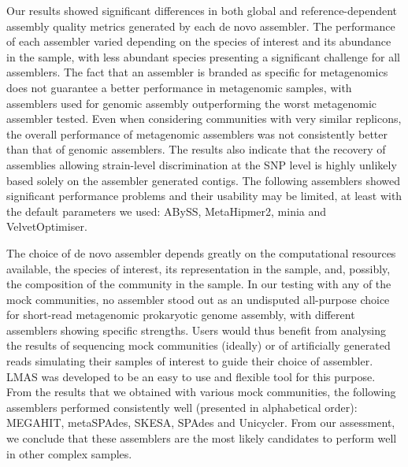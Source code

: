 Our results showed significant differences in both global and reference-dependent assembly quality metrics generated by each de novo assembler. The performance of each assembler varied depending on the species of interest and its abundance in the sample, with less abundant species presenting a significant challenge for all assemblers. The fact that an assembler is branded as specific for metagenomics does not guarantee a better performance in metagenomic samples, with assemblers used for genomic assembly outperforming the worst metagenomic assembler tested. Even when considering communities with very similar replicons, the overall performance of metagenomic assemblers was not consistently better than that of genomic assemblers. The results also indicate that the recovery of assemblies allowing strain-level discrimination at the SNP level is highly unlikely based solely on the assembler generated contigs. The following assemblers showed significant performance problems and their usability may be limited, at least with the default parameters we used: ABySS, MetaHipmer2, minia and VelvetOptimiser.

The choice of de novo assembler depends greatly on the computational resources available, the species of interest, its representation in the sample, and, possibly, the composition of the community in the sample. In our testing with any of the mock communities, no assembler stood out as an undisputed all-purpose choice for short-read metagenomic prokaryotic genome assembly, with different assemblers showing specific strengths. Users would thus benefit from analysing the results of sequencing mock communities (ideally) or of artificially generated reads simulating their samples of interest to guide their choice of assembler. LMAS was developed to be an easy to use and flexible tool for this purpose. From the results that we obtained with various mock communities, the following assemblers performed consistently well (presented in alphabetical order): MEGAHIT, metaSPAdes, SKESA, SPAdes and Unicycler. From our assessment, we conclude that these assemblers are the most likely candidates to perform well in other complex samples.

